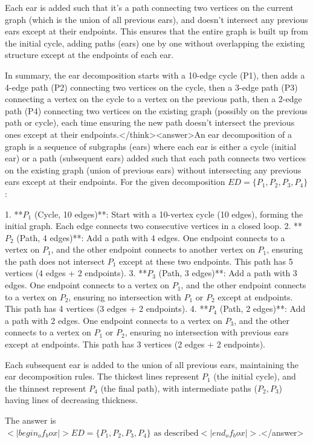 Each ear is added such that it's a path connecting two vertices on the current graph (which is the union of all previous ears), and doesn't intersect any previous ears except at their endpoints. This ensures that the entire graph is built up from the initial cycle, adding paths (ears) one by one without overlapping the existing structure except at the endpoints of each ear.

In summary, the ear decomposition starts with a 10-edge cycle (P1), then adds a 4-edge path (P2) connecting two vertices on the cycle, then a 3-edge path (P3) connecting a vertex on the cycle to a vertex on the previous path, then a 2-edge path (P4) connecting two vertices on the existing graph (possibly on the previous path or cycle), each time ensuring the new path doesn't intersect the previous ones except at their endpoints.</think><answer>An ear decomposition of a graph is a sequence of subgraphs (ears) where each ear is either a cycle (initial ear) or a path (subsequent ears) added such that each path connects two vertices on the existing graph (union of previous ears) without intersecting any previous ears except at their endpoints. For the given decomposition \( ED = \{P_1, P_2, P_3, P_4\} \):  

1. **\( P_1 \) (Cycle, 10 edges)**: Start with a 10-vertex cycle (10 edges), forming the initial graph. Each edge connects two consecutive vertices in a closed loop.  
2. **\( P_2 \) (Path, 4 edges)**: Add a path with 4 edges. One endpoint connects to a vertex on \( P_1 \), and the other endpoint connects to another vertex on \( P_1 \), ensuring the path does not intersect \( P_1 \) except at these two endpoints. This path has 5 vertices (4 edges + 2 endpoints).  
3. **\( P_3 \) (Path, 3 edges)**: Add a path with 3 edges. One endpoint connects to a vertex on \( P_1 \), and the other endpoint connects to a vertex on \( P_2 \), ensuring no intersection with \( P_1 \) or \( P_2 \) except at endpoints. This path has 4 vertices (3 edges + 2 endpoints).  
4. **\( P_4 \) (Path, 2 edges)**: Add a path with 2 edges. One endpoint connects to a vertex on \( P_3 \), and the other connects to a vertex on \( P_1 \) or \( P_2 \), ensuring no intersection with previous ears except at endpoints. This path has 3 vertices (2 edges + 2 endpoints).  

Each subsequent ear is added to the union of all previous ears, maintaining the ear decomposition rules. The thickest lines represent \( P_1 \) (the initial cycle), and the thinnest represent \( P_4 \) (the final path), with intermediate paths (\( P_2, P_3 \)) having lines of decreasing thickness.  

The answer is \(<|begin_of_box|>ED = \{P_1, P_2, P_3, P_4\} \text{ as described}<|end_of_box|>\).</answer>